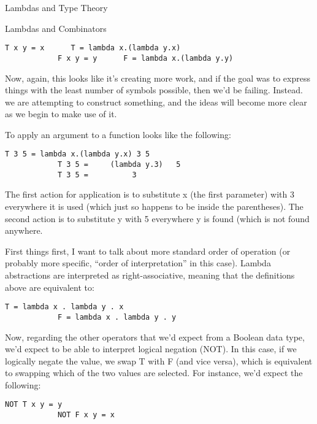 \begin{part}{Lambdas and Type Theory}
\begin{chapter}{Lambdas and Combinators}
        \begin{lstlisting}[language=Lambda]
            T x y = x      T = lambda x.(lambda y.x)
            F x y = y      F = lambda x.(lambda y.y)
        \end{lstlisting}
        
        Now, again, this looks like it's creating more work, and if the goal was to express things with the least number of symbols possible, then we'd be failing. Instead. we are attempting to construct something, and the ideas will become more clear as we begin to make use of it.
        
        To apply an argument to a function looks like the following:
        
        \begin{lstlisting}[language=Lambda]
            T 3 5 = lambda x.(lambda y.x) 3 5
            T 3 5 =     (lambda y.3)   5
            T 3 5 =          3
        \end{lstlisting}
        
        The first action for application is to substitute x (the first parameter) with 3 everywhere it is used (which just so happens to be inside the parentheses). The second action is to substitute y with 5 everywhere y is found (which is not found anywhere.
        
        First things first, I want to talk about more standard order of operation (or probably more specific, ``order of interpretation'' in this case). Lambda abstractions are interpreted as right-associative, meaning that the definitions above are equivalent to:
        
        \begin{lstlisting}[language=Lambda]
            T = lambda x . lambda y . x
            F = lambda x . lambda y . y
        \end{lstlisting}
        
        
        Now, regarding the other operators that we'd expect from a Boolean data type, we'd expect to be able to interpret logical negation (NOT). In this case, if we logically negate the value, we swap T with F (and vice versa), which is equivalent to swapping which of the two values are selected. For instance, we'd expect the following:
        
        \begin{lstlisting}[language=Lambda]
            NOT T x y = y
            NOT F x y = x
        \end{lstlisting}
        

\end{chapter}
\end{part}
